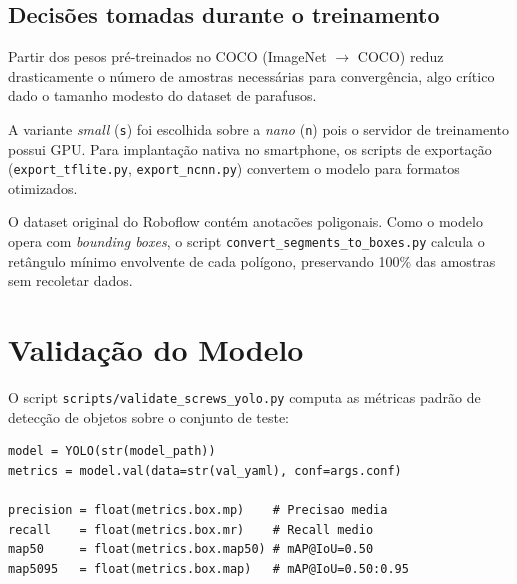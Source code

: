 \documentclass[12pt,a4paper]{article}
\begin{document}
\subsection{Decis\~oes tomadas durante o treinamento}

\begin{description}[leftmargin=*,style=nextline]
  \item[Transfer learning:] Partir dos pesos pr\'e-treinados no COCO (ImageNet $\to$ COCO)
    reduz drasticamente o n\'umero de amostras necess\'arias para converg\^encia, algo
    cr\'itico dado o tamanho modesto do dataset de parafusos.

  \item[Modelo \texttt{yolo11s} vs.\ \texttt{yolo11n}:] A variante \emph{small}
    (\texttt{s}) foi escolhida sobre a \emph{nano} (\texttt{n}) pois o servidor de
    treinamento possui GPU. Para implanta\c{c}\~ao nativa no smartphone, os scripts de
    exporta\c{c}\~ao (\texttt{export\_tflite.py}, \texttt{export\_ncnn.py}) convertem
    o modelo para formatos otimizados.

  \item[Convers\~ao de segmenta\c{c}\~ao para detec\c{c}\~ao:] O dataset original do
    Roboflow cont\'em anotac\~oes poligonais. Como o modelo opera com \emph{bounding boxes},
    o script \texttt{convert\_segments\_to\_boxes.py} calcula o ret\^angulo m\'inimo
    envolvente de cada pol\'igono, preservando 100\% das amostras sem recoletar dados.
\end{description}

\section{Valida\c{c}\~ao do Modelo}

O script \texttt{scripts/validate\_screws\_yolo.py} computa as m\'etricas padr\~ao de
detec\c{c}\~ao de objetos sobre o conjunto de teste:

\begin{lstlisting}[caption={Valida\c{c}\~ao e relat\'orio de m\'etricas}]
model = YOLO(str(model_path))
metrics = model.val(data=str(val_yaml), conf=args.conf)

precision = float(metrics.box.mp)    # Precisao media
recall    = float(metrics.box.mr)    # Recall medio
map50     = float(metrics.box.map50) # mAP@IoU=0.50
map5095   = float(metrics.box.map)   # mAP@IoU=0.50:0.95
\end{lstlisting}
\end{document}
